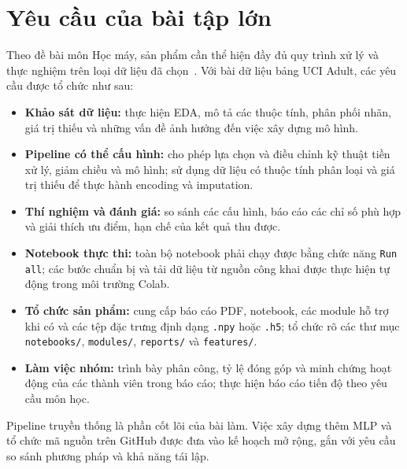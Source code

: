 \section{Yêu cầu của bài tập lớn}
\label{sec:1_4}
Theo đề bài môn Học máy, sản phẩm cần thể hiện đầy đủ quy trình xử lý và thực nghiệm trên loại dữ liệu đã chọn~\cite{ml-assignment}. Với bài dữ liệu bảng UCI Adult, các yêu cầu được tổ chức như sau:

\begin{itemize}
  \item \textbf{Khảo sát dữ liệu:} thực hiện EDA, mô tả các thuộc tính, phân phối nhãn, giá trị thiếu và những vấn đề ảnh hưởng đến việc xây dựng mô hình.
  \item \textbf{Pipeline có thể cấu hình:} cho phép lựa chọn và điều chỉnh kỹ thuật tiền xử lý, giảm chiều và mô hình; sử dụng dữ liệu có thuộc tính phân loại và giá trị thiếu để thực hành encoding và imputation.
  \item \textbf{Thí nghiệm và đánh giá:} so sánh các cấu hình, báo cáo các chỉ số phù hợp và giải thích ưu điểm, hạn chế của kết quả thu được.
  \item \textbf{Notebook thực thi:} toàn bộ notebook phải chạy được bằng chức năng \texttt{Run all}; các bước chuẩn bị và tải dữ liệu từ nguồn công khai được thực hiện tự động trong môi trường Colab.
  \item \textbf{Tổ chức sản phẩm:} cung cấp báo cáo PDF, notebook, các module hỗ trợ khi có và các tệp đặc trưng định dạng \texttt{.npy} hoặc \texttt{.h5}; tổ chức rõ các thư mục \texttt{notebooks/}, \texttt{modules/}, \texttt{reports/} và \texttt{features/}.
  \item \textbf{Làm việc nhóm:} trình bày phân công, tỷ lệ đóng góp và minh chứng hoạt động của các thành viên trong báo cáo; thực hiện báo cáo tiến độ theo yêu cầu môn học.
\end{itemize}

Pipeline truyền thống là phần cốt lõi của bài làm. Việc xây dựng thêm MLP và tổ chức mã nguồn trên GitHub được đưa vào kế hoạch mở rộng, gắn với yêu cầu so sánh phương pháp và khả năng tái lập.
